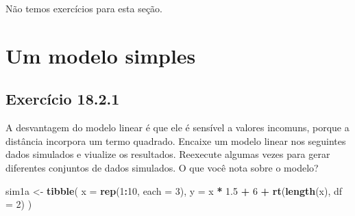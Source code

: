 \documentclass[
]{latex/krantz}
\newenvironment{Shaded}{\begin{snugshade}}{\end{snugshade}}
\newcommand{\AttributeTok}[1]{\textcolor[rgb]{0.13,0.29,0.53}{#1}}
\newcommand{\DecValTok}[1]{\textcolor[rgb]{0.00,0.00,0.81}{#1}}
\newcommand{\FloatTok}[1]{\textcolor[rgb]{0.00,0.00,0.81}{#1}}
\newcommand{\FunctionTok}[1]{\textcolor[rgb]{0.13,0.29,0.53}{\textbf{#1}}}
\newcommand{\NormalTok}[1]{#1}
\newcommand{\OtherTok}[1]{\textcolor[rgb]{0.56,0.35,0.01}{#1}}
\newcommand{\SpecialCharTok}[1]{\textcolor[rgb]{0.81,0.36,0.00}{\textbf{#1}}}
\theoremstyle{definition}
\theoremstyle{definition}
\theoremstyle{definition}
\theoremstyle{definition}
\theoremstyle{remark}
\begin{document}
Não temos exercícios para esta seção.

\hypertarget{um-modelo-simples}{%
\section{Um modelo simples}\label{um-modelo-simples}}

\hypertarget{exr18-2-1}{%
\subsection*{Exercício 18.2.1}\label{exr18-2-1}}

A desvantagem do modelo linear é que ele é sensível a valores incomuns, porque a distância incorpora um termo quadrado. Encaixe um modelo linear nos seguintes dados simulados e viualize os resultados. Reexecute algumas vezes para gerar diferentes conjuntos de dados simulados. O que você nota sobre o modelo?

\begin{Shaded}
\begin{Highlighting}[]
\NormalTok{sim1a }\OtherTok{\textless{}{-}} \FunctionTok{tibble}\NormalTok{(}
  \AttributeTok{x =} \FunctionTok{rep}\NormalTok{(}\DecValTok{1}\SpecialCharTok{:}\DecValTok{10}\NormalTok{, }\AttributeTok{each =} \DecValTok{3}\NormalTok{),}
  \AttributeTok{y =}\NormalTok{ x }\SpecialCharTok{*} \FloatTok{1.5} \SpecialCharTok{+} \DecValTok{6} \SpecialCharTok{+} \FunctionTok{rt}\NormalTok{(}\FunctionTok{length}\NormalTok{(x), }\AttributeTok{df =} \DecValTok{2}\NormalTok{)}
\NormalTok{)}
\end{Highlighting}
\end{Shaded}
\end{document}

